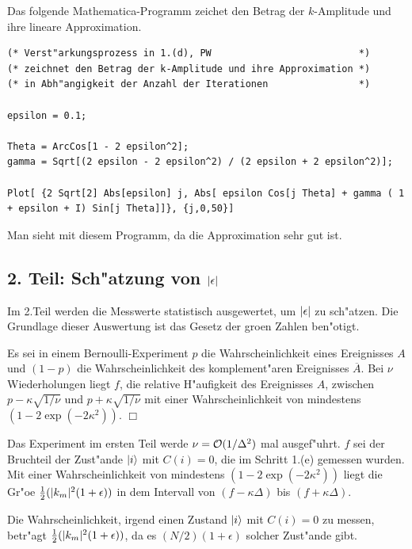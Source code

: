              Das folgende Mathematica-Programm zeichet den Betrag der $k$-Amplitude und ihre lineare Approximation.
             \begin{center}
             {\footnotesize
             \begin{verbatim}
(* Verst"arkungsprozess in 1.(d), PW                          *)
(* zeichnet den Betrag der k-Amplitude und ihre Approximation *)
(* in Abh"angigkeit der Anzahl der Iterationen                *)

epsilon = 0.1;

Theta = ArcCos[1 - 2 epsilon^2];
gamma = Sqrt[(2 epsilon - 2 epsilon^2) / (2 epsilon + 2 epsilon^2)]; 

Plot[ {2 Sqrt[2] Abs[epsilon] j, Abs[ epsilon Cos[j Theta] + gamma ( 1 + epsilon + I) Sin[j Theta]]}, {j,0,50}] 
             \end{verbatim}
             }
             \end{center}           
             Man sieht mit diesem Programm, da\3 die Approximation sehr gut ist.
             \subsection*{2. Teil: Sch"atzung von $\vert \epsilon \vert$}
             Im 2.Teil werden die Messwerte statistisch ausgewertet, um $\vert \epsilon \vert$ zu sch"atzen. Die Grundlage dieser Auswertung ist das 
             Gesetz der gro\3en Zahlen ben"otigt.
             \begin{satz}
               Es sei in einem Bernoulli-Experiment $p$ die Wahrscheinlichkeit eines Ereignisses $A$ und $(1-p)$ die Wahrscheinlichkeit des komplement"aren 
               Ereignisses $\overline{A}$. Bei $\nu$ Wiederholungen liegt $f$, die relative H"aufigkeit des Ereignisses $A$, zwischen $p-\kappa\sqrt{1/\nu}$ und
               $p+\kappa\sqrt{1/\nu}$ mit einer Wahrscheinlichkeit von mindestens $(1-2\exp(-2\kappa^2))$. \hfill $\Box$
             \end{satz}
             \begin{lemma} Das Experiment im ersten Teil werde $\nu = {\cal O}(1/\Delta^2)$ mal ausgef"uhrt. $f$ sei der Bruchteil der Zust"ande 
               $\left| i \right>$ mit
               $C(i)=0$, die im Schritt 1.(e) gemessen wurden. Mit einer Wahrscheinlichkeit von mindestens $(1-2\exp(-2\kappa^2))$ liegt die Gr"o\3e 
               $ \frac{1}{2}(\vert k_m  \vert^2(1+\epsilon))$ in dem Intervall von $(f-\kappa\Delta)$ bis $(f+\kappa\Delta)$.
             \end{lemma}
             \beweis Die Wahrscheinlichkeit, irgend einen Zustand $\left| i \right>$ mit $C(i)=0$ 
             zu messen, betr"agt $\frac{1}{2}(\vert k_m  \vert^2(1+\epsilon))$, da es $(N/2)(1+\epsilon)$ solcher Zust"ande gibt. 
          
